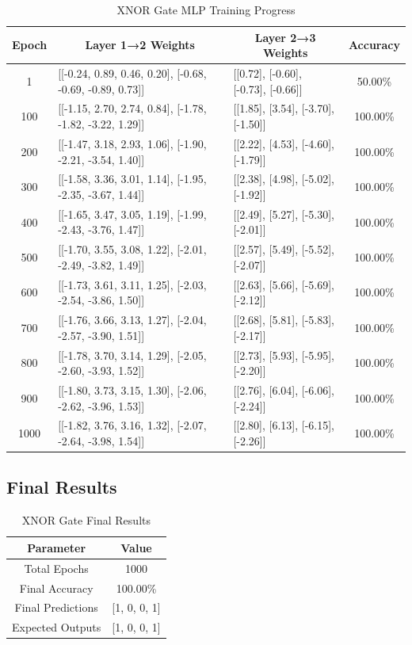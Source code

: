\documentclass[12pt]{article}
\begin{document}
\begin{table}[H]
\centering
\caption{XNOR Gate MLP Training Progress}
\renewcommand{\arraystretch}{1.2}
\small
\begin{tabular}{|c|p{8cm}|p{6cm}|c|}
\hline
\multicolumn{1}{|c|}{\textbf{Epoch}} & \multicolumn{1}{c|}{\textbf{Layer 1→2 Weights}} & \multicolumn{1}{c|}{\textbf{Layer 2→3 Weights}} & \multicolumn{1}{c|}{\textbf{Accuracy}} \\
\hline
1 & [[-0.24, 0.89, 0.46, 0.20], [-0.68, -0.69, -0.89, 0.73]] & [[0.72], [-0.60], [-0.73], [-0.66]] & 50.00\% \\
\hline
100 & [[-1.15, 2.70, 2.74, 0.84], [-1.78, -1.82, -3.22, 1.29]] & [[1.85], [3.54], [-3.70], [-1.50]] & 100.00\% \\
\hline
200 & [[-1.47, 3.18, 2.93, 1.06], [-1.90, -2.21, -3.54, 1.40]] & [[2.22], [4.53], [-4.60], [-1.79]] & 100.00\% \\
\hline
300 & [[-1.58, 3.36, 3.01, 1.14], [-1.95, -2.35, -3.67, 1.44]] & [[2.38], [4.98], [-5.02], [-1.92]] & 100.00\% \\
\hline
400 & [[-1.65, 3.47, 3.05, 1.19], [-1.99, -2.43, -3.76, 1.47]] & [[2.49], [5.27], [-5.30], [-2.01]] & 100.00\% \\
\hline
500 & [[-1.70, 3.55, 3.08, 1.22], [-2.01, -2.49, -3.82, 1.49]] & [[2.57], [5.49], [-5.52], [-2.07]] & 100.00\% \\
\hline
600 & [[-1.73, 3.61, 3.11, 1.25], [-2.03, -2.54, -3.86, 1.50]] & [[2.63], [5.66], [-5.69], [-2.12]] & 100.00\% \\
\hline
700 & [[-1.76, 3.66, 3.13, 1.27], [-2.04, -2.57, -3.90, 1.51]] & [[2.68], [5.81], [-5.83], [-2.17]] & 100.00\% \\
\hline
800 & [[-1.78, 3.70, 3.14, 1.29], [-2.05, -2.60, -3.93, 1.52]] & [[2.73], [5.93], [-5.95], [-2.20]] & 100.00\% \\
\hline
900 & [[-1.80, 3.73, 3.15, 1.30], [-2.06, -2.62, -3.96, 1.53]] & [[2.76], [6.04], [-6.06], [-2.24]] & 100.00\% \\
\hline
1000 & [[-1.82, 3.76, 3.16, 1.32], [-2.07, -2.64, -3.98, 1.54]] & [[2.80], [6.13], [-6.15], [-2.26]] & 100.00\% \\
\hline
\end{tabular}
\end{table}



\subsection*{Final Results}
\begin{table}[H]
\centering
\caption{XNOR Gate Final Results}
\renewcommand{\arraystretch}{2.4}
\begin{tabular}{|c|c|}
\hline
\textbf{Parameter} & \textbf{Value} \\
\hline
Total Epochs & 1000 \\
\hline
Final Accuracy & 100.00\% \\
\hline
Final Predictions & [1, 0, 0, 1] \\
\hline
Expected Outputs & [1, 0, 0, 1] \\
\hline
\end{tabular}
\end{table}
\end{document}
